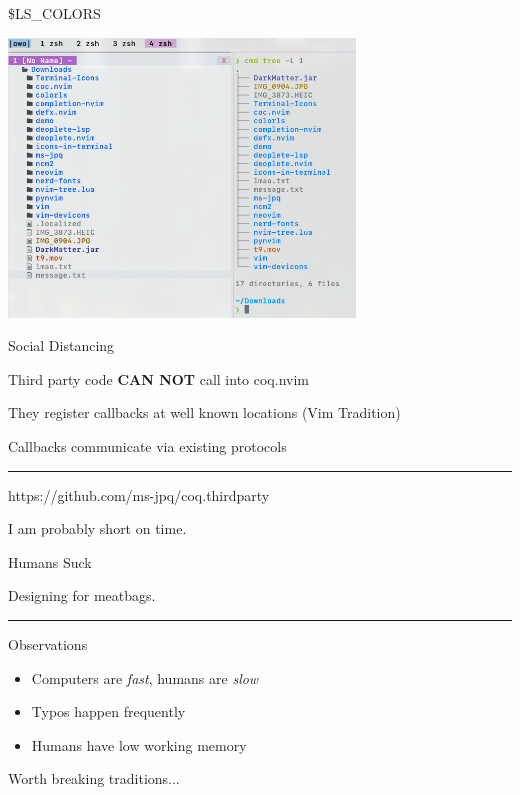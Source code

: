 \documentclass{beamer}
\begin{document}
\begin{frame}{\$LS\_COLORS}

	\includegraphics[width=\textwidth,height=20em]{chadtree_ls}

\end{frame}


\begin{frame}{Social Distancing}

	Third party code \textbf{CAN NOT} call into coq.nvim

	They register callbacks at well known locations (Vim Tradition)

	Callbacks communicate via existing protocols

	\rule{\textwidth}{0.1em}

	https://github.com/ms-jpq/coq.thirdparty

\end{frame}


\begin{frame}[standout]

	I am probably short on time.

\end{frame}


\begin{frame}{Humans Suck}

	Designing for meatbags.

	\rule{\textwidth}{0.1em}

	\begin{block}{Observations}

		\begin{itemize}

			\item Computers are \textit{fast}, humans are \textit{slow}

			\item Typos happen frequently

			\item Humans have low working memory

		\end{itemize}

	\end{block}

	Worth breaking traditions...

\end{frame}
\end{document}
